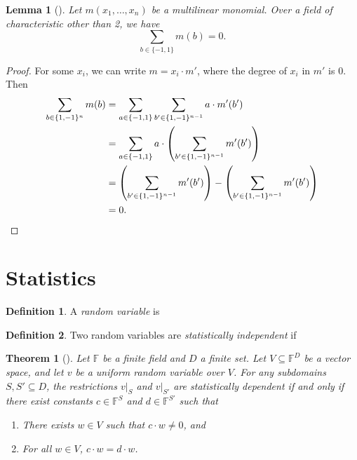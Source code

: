 \documentclass[english,12pt]{reedthesis}
\theoremstyle{plain}
\newtheorem{thm}{Theorem}[section]
\newtheorem{lemma}[lemma]{Lemma}
\theoremstyle{definition}
\newtheorem{defn}[defn]{Definition}
\theoremstyle{remark}
\begin{document}

\begin{lemma}[{\cite[Lemma 7]{JKRS09}}]\label{lem:monomial-sum}
  Let $m(x_{1}, \ldots, x_{n})$ be a multilinear monomial. Over a field of
  characteristic other than 2, we have
  \begin{equation}
    \sum_{b \in \{-1, 1\}}m(b) = 0.
  \end{equation}
\end{lemma}

\begin{proof}
  For some $x_{i}$, we can write $m = x_{i} \cdot m'$, where the degree of $x_{i}$
  in $m'$ is 0. Then
  \begin{align*}
    \sum_{b \in \{1, -1\}^{n}}m(b)
    &= \sum_{a \in \{-1, 1\}}\sum_{b' \in \{1, -1\}^{n-1}}a \cdot m'(b') \\
    &= \sum_{a \in \{-1, 1\}} a \cdot \mleft(\sum_{b' \in \{1, -1\}^{n-1}} m'(b')\mright) \\
    &= \mleft(\sum_{b' \in \{1, -1\}^{n-1}} m'(b')\mright) - \mleft(\sum_{b' \in \{1, -1\}^{n-1}} m'(b')\mright) \\
    &= 0.
  \end{align*}
\end{proof}

\section{Statistics}

\begin{defn}\label{def:random-var}
  A \emph{random variable} is %
\end{defn}

\begin{defn}\label{def:stat-indep}
  Two random variables are \emph{statistically independent} if
\end{defn}



\begin{thm}[{\cite[Claim 2]{CFGS22}}]\label{thm:lin-indep-stat-indep}
  Let $\mathbb{F}$ be a finite field and $D$ a finite set. Let
  $V \subseteq \mathbb{F}^{D}$ be a vector space, and let $v$ be a uniform random
  variable over $V$. For any subdomains $S, S' \subseteq D$, the restrictions $v|_{S}$
  and $v|_{S'}$ are statistically dependent if and only if there exist constants
  $c \in \mathbb{F}^{S}$ and $d \in \mathbb{F}^{S'}$ such that
  \begin{enumerate}
    \item There exists $w \in V$ such that $c \cdot w \ne 0$, and
    \item For all $w \in V$, $c \cdot w = d \cdot w$.
  \end{enumerate}
\end{thm}
\end{document}
